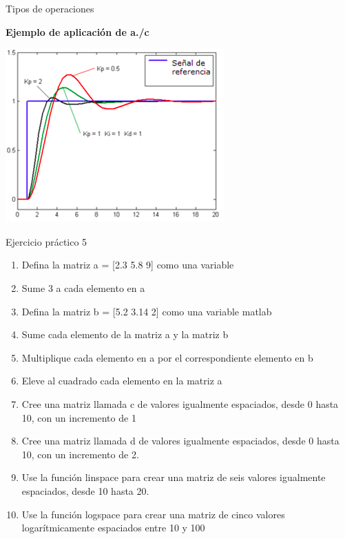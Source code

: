 \documentclass{bredelebeamer}
\begin{document}
\begin{frame}{Tipos de operaciones}
\begin{center}
\textbf{Ejemplo de aplicación de a./c}
\end{center}
\begin{center}
\includegraphics[scale=0.6]{images/img41.png}
\end{center}
\end{frame}

\begin{frame}{Ejercicio práctico 5}
\begin{enumerate}
\item Defina la matriz a = [2.3 5.8 9] como una variable
\item Sume 3 a cada elemento en a
\item Defina la matriz b = [5.2 3.14 2] como una variable matlab
\item Sume cada elemento de la matriz a y la matriz b
\item Multiplique cada elemento en a por el correspondiente elemento en b
\item Eleve al cuadrado cada elemento en la matriz a
\item Cree una matriz llamada c de valores igualmente espaciados, desde 0 hasta 10, con un incremento de 1
\item Cree una matriz llamada d de valores igualmente espaciados, desde 0 hasta 10, con un incremento de 2.
\item Use la función linspace para crear una matriz de seis valores igualmente espaciados, desde 10 hasta 20.
\item Use la función logspace para crear una matriz de cinco valores logarítmicamente espaciados entre 10 y 100
\end{enumerate}
\end{frame}

\end{document}

